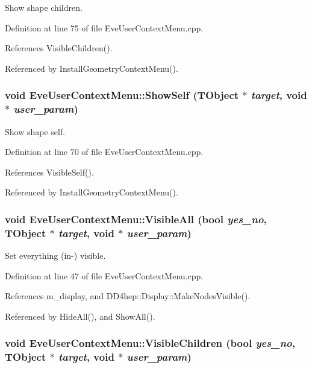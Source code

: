 Show shape children. 

Definition at line 75 of file EveUserContextMenu.cpp.

References VisibleChildren().

Referenced by InstallGeometryContextMenu().\hypertarget{class_d_d4hep_1_1_eve_user_context_menu_a38b76e87d1f304a24dc46692090c9c7f}{
\subsubsection[{ShowSelf}]{\setlength{\rightskip}{0pt plus 5cm}void EveUserContextMenu::ShowSelf ({\bf TObject} $\ast$ {\em target}, \/  void $\ast$ {\em user\_\-param})}}
\label{class_d_d4hep_1_1_eve_user_context_menu_a38b76e87d1f304a24dc46692090c9c7f}


Show shape self. 

Definition at line 70 of file EveUserContextMenu.cpp.

References VisibleSelf().

Referenced by InstallGeometryContextMenu().\hypertarget{class_d_d4hep_1_1_eve_user_context_menu_ac41f26a1ef86468fb37da4a1fad9b4df}{
\subsubsection[{VisibleAll}]{\setlength{\rightskip}{0pt plus 5cm}void EveUserContextMenu::VisibleAll (bool {\em yes\_\-no}, \/  {\bf TObject} $\ast$ {\em target}, \/  void $\ast$ {\em user\_\-param})}}
\label{class_d_d4hep_1_1_eve_user_context_menu_ac41f26a1ef86468fb37da4a1fad9b4df}


Set everything (in-\/) visible. 

Definition at line 47 of file EveUserContextMenu.cpp.

References m\_\-display, and DD4hep::Display::MakeNodesVisible().

Referenced by HideAll(), and ShowAll().\hypertarget{class_d_d4hep_1_1_eve_user_context_menu_acf1a858a9cb9c8ba26bd351300a53a3c}{
\subsubsection[{VisibleChildren}]{\setlength{\rightskip}{0pt plus 5cm}void EveUserContextMenu::VisibleChildren (bool {\em yes\_\-no}, \/  {\bf TObject} $\ast$ {\em target}, \/  void $\ast$ {\em user\_\-param})}}
\label{class_d_d4hep_1_1_eve_user_context_menu_acf1a858a9cb9c8ba26bd351300a53a3c}


